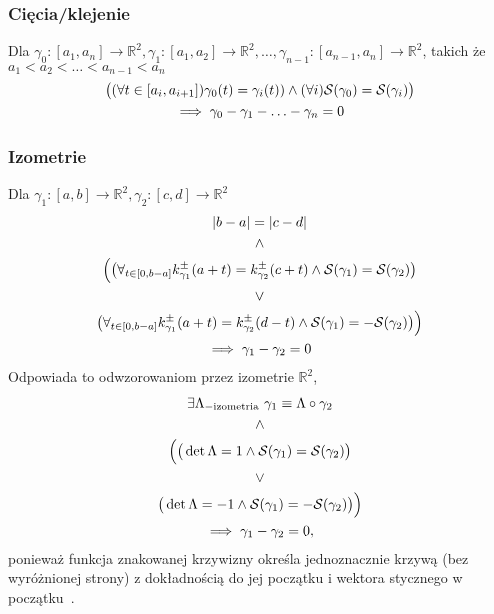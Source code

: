 \documentclass[a4paper, 12pt, twosided]{article}
\begin{document}
\subsubsection{Cięcia/klejenie}
Dla $\gamma_0 : [a_1, a_n] \to \mathbb{R}^2, \gamma_1 : [a_1, a_2] \to \mathbb{R}^2, \ldots, 
\gamma_{n-1} :
[a_{n-1}, a_n] \to \mathbb{R}^2$, takich że $a_1 < a_2 < \ldots < a_{n-1} < a_n$
\begin{gather}
    \big(
    (\forall t \in [a_i, a_{i+1}])\gamma_0(t)=\gamma_i(t)) \land (\forall i)\mathcal{S}(\gamma_0) =
    \mathcal{S}(\gamma_i)
    \big) \\
    \implies \gamma_0 - \gamma_1 - \ldots -\gamma_n = 0\notag
\end{gather}
\subsubsection{Izometrie}
Dla $\gamma_1 : [a, b] \to \mathbb{R}^2, \gamma_2 : [c, d] \to \mathbb{R}^2$
\begin{gather}
    |b-a| = |c-d| \\
    \land \\
    \Big(\big( \forall_{t \in [0, b-a]}k^\pm_{\gamma_1}(a+t) = k^\pm_{\gamma_2}(c+t)
    \land
    \mathcal{S}(\gamma_1)=\mathcal{S}(\gamma_2)\big) \notag\\
    \lor \\
    \big(\forall_{t \in [0, b-a]}k^\pm_{\gamma_1}(a+t) = k^\pm_{\gamma_2}(d-t)
    \land
    \mathcal{S}(\gamma_1)=-\mathcal{S}(\gamma_2)\big)\Big) \notag\\
    \implies \gamma_1 - \gamma_2 = 0\notag
\end{gather}
Odpowiada to odwzorowaniom przez izometrie $\mathbb{R}^2$,
\begin{gather}
    \exists\Lambda_{-\text{izometria}}\ \gamma_1 \equiv \Lambda\circ\gamma_2 \notag\\
    \land \notag\\
    \Big(\big(\det{\Lambda} = 1 \land \mathcal{S}(\gamma_1)=\mathcal{S}(\gamma_2) \big) \\
    \lor \notag\\
    \big(\det{\Lambda} = -1 \land \mathcal{S}(\gamma_1)=-\mathcal{S}(\gamma_2) \big)\Big) \notag\\
    \implies \gamma_1 - \gamma_2 = 0,\notag
\end{gather}
ponieważ funkcja znakowanej krzywizny określa jednoznacznie krzywą (bez wyróżnionej strony)
z dokładnością do jej początku i wektora stycznego w początku~\cite{Spivak}.
\end{document}
